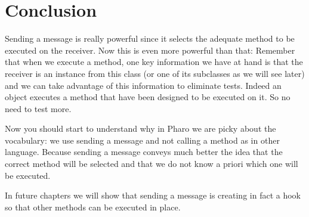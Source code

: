 \documentclass[10pt,twoside,english]{_support/latex/sbabook/sbabook}
\begin{document}
\section{Conclusion}
Sending a message is really powerful since it selects the adequate method to be executed on the receiver. Now this is even more powerful than that: Remember that when we execute a method, one key information we have at hand is that the receiver is an instance from this class (or one of its subclasses as we will see later) and we can take advantage of this information to eliminate tests. Indeed an object executes a method that have been designed to be executed on it. So no need to test more.

Now you should start to understand why in Pharo we are picky about the vocabulary: we use sending a message and not calling a method as in other language. Because sending a message conveys much better the idea that the correct method will be selected and that we do not know a priori which one will be executed. 

In future chapters we will show that sending a message is creating in fact a hook so that other methods can be executed in place. 


\backmatter



\end{document}
